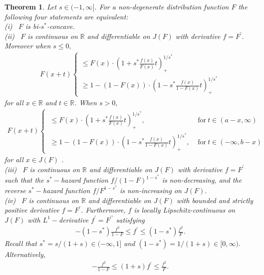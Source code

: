 \documentclass[11pt]{amsart}
\numberwithin{equation}{section}
\newcommand{\RR}{\mathbb{R}}
\theoremstyle{definition}\newtheorem{definition}{Definition}
\theoremstyle{remark}\newtheorem{assumption}{Assumption}
\theoremstyle{remark}\newtheorem{remark}{Remark}
\theoremstyle{definition}\newtheorem{example}{Example}
\theoremstyle{plain}\newtheorem{question}{Question}
\theoremstyle{plain}\newtheorem{theorem}{Theorem}
\theoremstyle{plain}\newtheorem{lemma}{Lemma}
\theoremstyle{plain}\newtheorem{proposition}{Proposition}
\theoremstyle{plain}\newtheorem{corollary}{Corollary}
\theoremstyle{plain}\newtheorem{conjecture}{Conjecture}
\begin{document}
\begin{theorem}
\label{thm:1s}
Let $s \in (-1,\infty]$. For a non-degenerate distribution function $F$ the following 
four statements are equivalent:\\
(i) \ $F$ is bi-$s^*$-concave.\\
(ii) \ $F$ is continuous on $\RR$ and differentiable on $J(F)$ with derivative $f=F^{\prime}.$ Moreover when $s\leq 0,$ 
\begin{eqnarray}\label{th12}
F(x+t) \left \{ \begin{array}{l}  \le F(x) \cdot \left ( 1+ s^* \frac{f(x)}{F(x)} t \right )_{+}^{1/s^*} \\ 
                \ge 1 - (1-F(x)) \cdot \left (1 - s^* \frac{f(x)}{1-F(x)} t \right )_{+}^{1/s^*} 
\end{array} \right. 
\end{eqnarray}
for all $x\in\RR$ and  $t \in \RR$. When $s>0,$
\begin{align}\label{th12n}
F(x+t)\begin{cases} \ \le F(x) \cdot \left ( 1+ s^* \frac{f(x)}{F(x)} t \right )_{+}^{1/s^*},& \text{ for}\ t\in(a-x,\infty)\\ 
               \ \ge 1 - (1-F(x)) \cdot \left (1 - s^* \frac{f(x)}{1-F(x)} t \right )_{+}^{1/s^*},& \text{ for}\  t\in(-\infty,b-x)
\end{cases}
\end{align}
for all $x \in J(F)$ .\\
(iii) \ $F$ is continuous on $\RR$ and differentiable on $J(F)$ with derivative $f = F^{\prime}$ such that the 
$s^*-$hazard function $ f/(1-F)^{1-s^*}$ is non-decreasing, and the 
reverse $s^*-$hazard function $  f/F^{1-s^*}$ is 
non-increasing on $J(F)$.\\
(iv) \ $F$ is continuous on $\RR$ and differentiable on $J(F)$ with bounded 
and strictly positive derivative $f = F^{\prime}$.  Furthermore, $f$ is locally Lipschitz-continuous on $J(F)$ with 
$L^1-$derivative  $f^{\prime} = F^{\prime \prime} $ satisfying 
\begin{eqnarray}\label{4eq3}
-(1-s^*)\frac{f^2}{1-F} \le f^{\prime} \le (1-s^*)\frac{f^2}{F} .
\end{eqnarray}
Recall that $s^* = s/(1+s) \in (-\infty, 1]$ and  $(1-s^*) = 1/(1+s) \in [0,\infty)$.  
Alternatively,
\begin{eqnarray*}
-\frac{f^2}{1-F} \le (1+s) f^{\prime} \le \frac{f^2}{F} .
\end{eqnarray*}
\end{theorem}
\smallskip
\end{document}
